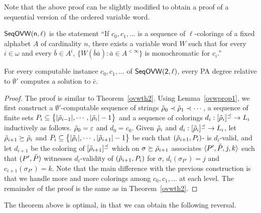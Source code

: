 Note that the above proof can be slightly modified to obtain a proof of a sequential version of the ordered variable word.

\begin{statement}
$\mathsf{Seq}\sf{OVW}(n,\ell)$ is the statement ``If $c_0, c_1, \dots$ is a sequence of $\ell$-colorings of a fixed alphabet $A$ of cardinality $n$, there exists a variable word $W$ such that for every $i \in \omega$ and every $\bar b \in A^i$, $\{W(\bar b\bar a) : \bar a \in A^{<\infty}\}$ is monochromatic for $c_i$.''
\end{statement}

\begin{theorem}
For every computable instance $c_0, c_1, \dots$ of $\mathsf{Seq}\sf{OVW}(2,\ell)$,
every PA degree relative to $\emptyset'$ computes a solution to $\bar c$.
\end{theorem}
\begin{proof}
	The proof is similar to Theorem~\ref{ovwth2}. Using Lemma~\ref{ovwprop1}, we first construct a $\emptyset'$-computable sequence of strings
 $\tilde{\rho}_0 \prec \tilde{\rho}_1 \prec\cdots$,
a sequence of finite sets $P_i\subseteq \big\{
|\tilde{\rho}_{i-1}|,\cdots, |\tilde{\rho}_i|-1
\big\}$ and a sequence of colorings $d_i:[\tilde{\rho}_i]^\preceq\rightarrow
L_i$ inductively as follows.
$\tilde{\rho}_0 = \varepsilon$ and $d_0 = c_0$.
Given $\tilde{\rho}_i$ and $d_i:[\tilde{\rho}_i]^\preceq\rightarrow
L_i$, let $\tilde{\rho}_{i+1} \succeq \tilde{\rho}_i$
and $P_i\subseteq
\big\{ |\tilde{\rho}_i|,\cdots,|\tilde{\rho}_{i+1}|-1\big\}$ be such that
$(\tilde{\rho}_{i+1}, P_i)$- is $d_i$-valid,
and let $d_{i+1}$ be the coloring of $[\tilde{\rho}_{i+1}]^{\preceq}$ which on $\sigma \succeq \tilde{\rho}_{i+1}$
associates $\langle P', \tilde{P}, j, k \rangle$ such that
$(P',\tilde{P})$ witnesses $d_i$-validity of $(\tilde{\rho}_{i+1}, P_i)$
for $\sigma$, $d_i(\sigma_{P'}) = j$ and $c_{i+1}(\sigma_{P'}) = k$. Note that the main difference with the previous construction is that we handle more and more colorings among $c_0, c_1, \dots$ at each level. The remainder of the proof is the same as in Theorem~\ref{ovwth2}.
\end{proof}

The theorem above is optimal, in that we can obtain the following reversal.

